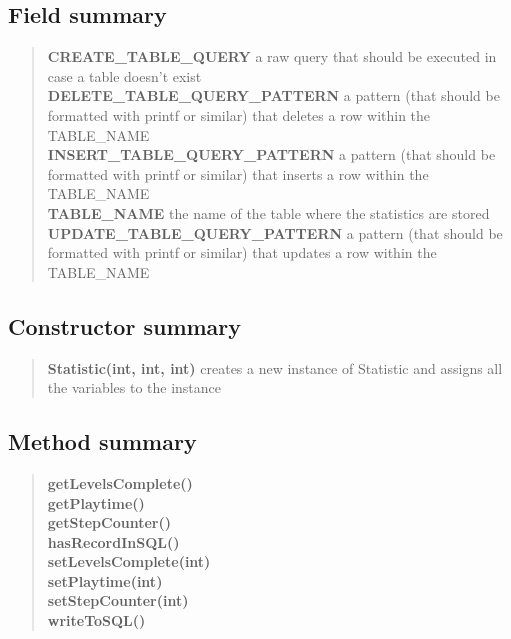 \documentclass[11pt,a4paper]{report}
\begin{document}
{{{{{\subsection{Field summary}{
\begin{verse}
{\bf CREATE\_TABLE\_QUERY} a raw query that should be executed in case a table doesn't exist\\
{\bf DELETE\_TABLE\_QUERY\_PATTERN} a pattern (that should be formatted with printf or similar) that deletes a row within the TABLE\_NAME\\
{\bf INSERT\_TABLE\_QUERY\_PATTERN} a pattern (that should be formatted with printf or similar) that inserts a row within the TABLE\_NAME\\
{\bf TABLE\_NAME} the name of the table where the statistics are stored\\
{\bf UPDATE\_TABLE\_QUERY\_PATTERN} a pattern (that should be formatted with printf or similar) that updates a row within the TABLE\_NAME\\
\end{verse}
}
\subsection{Constructor summary}{
\begin{verse}
{\bf Statistic(int, int, int)} creates a new instance of Statistic and assigns all the variables to the instance\\
\end{verse}
}
\subsection{Method summary}{
\begin{verse}
{\bf getLevelsComplete()} \\
{\bf getPlaytime()} \\
{\bf getStepCounter()} \\
{\bf hasRecordInSQL()} \\
{\bf setLevelsComplete(int)} \\
{\bf setPlaytime(int)} \\
{\bf setStepCounter(int)} \\
{\bf writeToSQL()} \\
\end{verse}
}
}}}}}
\end{document}
